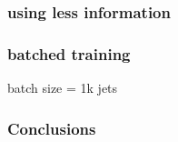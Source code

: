 \documentclass{beamer}
\begin{document}
\begin{frame}
  \frametitle{using less information}
    \begin{figure}[htb]
    \centering
  \end{figure}

\end{frame}

\begin{frame}
  \frametitle{batched training}
  batch size = 1k jets

    \begin{figure}[htb]
    \centering
  \end{figure}

\end{frame}

\begin{frame}
  \frametitle{Conclusions}

\end{frame}
\end{document}
